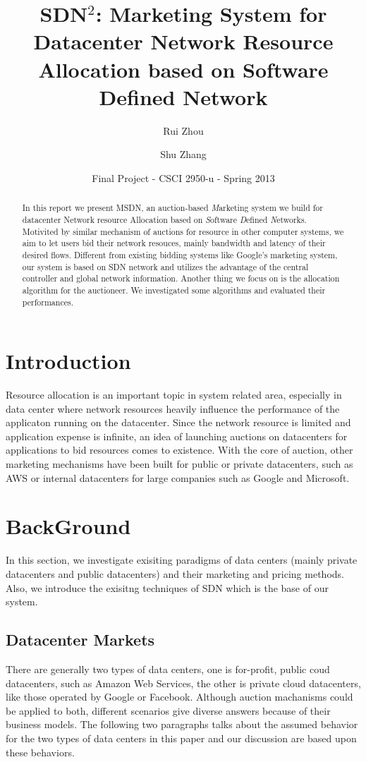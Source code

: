 \documentclass[a4paper,11pt,twocolumn]{article}
\begin{document}
\title{SDN$^{2}$: Marketing System for Datacenter Network Resource Allocation based on Software Defined Network}
\author{Rui Zhou \and Shu Zhang}
\date{Final Project - CSCI 2950-u - Spring 2013}
\maketitle

\begin{abstract}
In this report we present MSDN, an auction-based \emph{M}arketing system we build for datacenter Network resource Allocation based on \emph{S}oftware \emph{D}efined \emph{N}etworks.
Motivited by similar mechanism of auctions for resource in other computer systems, we aim to 
let users bid their network resouces, mainly bandwidth and latency of their desired flows. Different from existing 
bidding systems like Google's marketing system\cite{google}, our system is based on SDN network and utilizes the advantage
of the central controller and global network information. 
Another thing we focus on is the allocation algorithm for the auctioneer. We investigated some 
algorithms and evaluated their performances. 
\end{abstract}

\section{Introduction}
Resource allocation is an important topic in system related area, especially in data center where network resources heavily influence the performance 
of the applicaton running on the datacenter. Since the network resource is limited and application expense is infinite, an idea of launching auctions on
datacenters for applications to bid resources comes to existence. With the core of auction, other marketing mechanisms have been built for public or 
private datacenters, such as AWS\cite{aws} or internal datacenters for large companies such as Google and Microsoft. 

\section{BackGround}
In this section, we investigate exisiting paradigms of data centers (mainly private datacenters and public datacenters) and their marketing and 
pricing methods. Also, we introduce the exisitng techniques of SDN which is the base of our system.
\subsection{Datacenter Markets}
There are generally two types of data centers, one is for-profit, public coud datacenters, such as Amazon Web Services\cite{aws}, the other is private cloud
datacenters, like those operated by Google or Facebook. Although auction machanisms could be applied to both, different scenarios give diverse answers because of 
their business models. The following two paragraphs talks about the assumed behavior for the two types of data centers in this paper and our discussion are 
based upon these behaviors.
\end{document}
